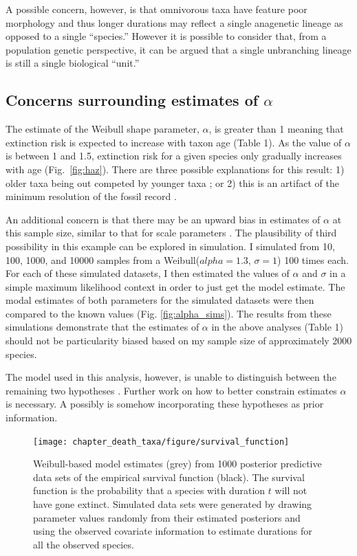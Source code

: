 A possible concern, however, is that omnivorous taxa have feature poor morphology and thus longer durations may reflect a single anagenetic lineage as opposed to a single ``species.'' However it is possible to consider that, from a population genetic perspective, it can be argued that a single unbranching lineage is still a single biological ``unit.''

\subsection{Concerns surrounding estimates of $\alpha$}
The estimate of the Weibull shape parameter, $\alpha$, is greater than 1 meaning that extinction risk is expected to increase with taxon age (Table 1). As the value of $\alpha$ is between 1 and 1.5, extinction risk for a given species only gradually increases with age (Fig.~\ref{fig:haz}). There are three possible explanations for this result: 1) older taxa being out competed by younger taxa \cite{Wagner2014b}; or 2) this is an artifact of the minimum resolution of the fossil record \cite{Sepkoski1975}. 

An additional concern is that there may be an upward bias in estimates of $\alpha$ at this sample size, similar to that for scale parameters \cite{Gelman2013d}. The plausibility of third possibility in this example can be explored in simulation. I simulated from 10, 100, 1000, and 10000 samples from a Weibull(\(alpha = 1.3\), \(\sigma = 1\)) 100 times each. For each of these simulated datasets, I then estimated the values of \(\alpha\) and \(\sigma\) in a simple maximum likelihood context in order to just get the model estimate. The modal estimates of both parameters for the simulated datasets were then compared to the known values (Fig. \ref{fig:alpha_sims}). The results from these simulations demonstrate that the estimates of \(\alpha\) in the above analyses (Table 1) should not be particularity biased based on my sample size of approximately 2000 species. 

The model used in this analysis, however, is unable to distinguish between the remaining two hypotheses \cite{Sepkoski1975,Wagner2014b}. Further work on how to better constrain estimates $\alpha$ is necessary. A possibly is somehow incorporating these hypotheses as prior information.





\begin{figure}[ht]
  \centering
  \texttt{[image: chapter\_death\_taxa/figure/survival\_function]}
  \caption[Posterior predictive checks]{Weibull-based model estimates (grey) from 1000 posterior predictive data sets of the empirical survival function (black). The survival function is the probability that a species with duration \(t\) will not have gone extinct. Simulated data sets were generated by drawing parameter values randomly from their estimated posteriors and using the observed covariate information to estimate durations for all the observed species.}
  \label{fig:ppc_surv}
\end{figure}

